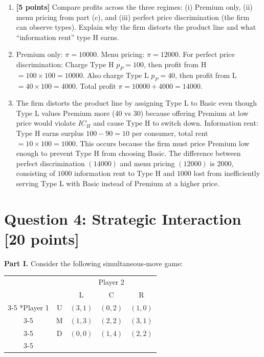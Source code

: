 \documentclass[11pt]{article}
\begin{document}
\begin{enumerate}[label=(\alph*)]
    \item \textbf{[5 points]} Compare profits across the three regimes: (i) Premium only, (ii) menu pricing from part (c), and (iii) perfect price discrimination (the firm can observe types). Explain why the firm distorts the product line and what ``information rent'' type H earns.
    \item[] Premium only: $\pi=10000$. Menu pricing: $\pi=12000$. For perfect price discrimination: Charge Type H $p_P=100$, then profit from H $=100\times100=10000$. Also charge Type L $p_P=40$, then profit from L $=40\times100=4000$. Total profit $\pi=10000+4000=14000$.
    \item[] The firm distorts the product line by assigning Type L to Basic even though Type L values Premium more (40 vs 30) because offering Premium at low price would violate $IC_H$ and cause Type H to switch down. Information rent: Type H earns surplus $100-90=10$ per consumer, total rent $=10\times100=1000$. This occurs because the firm must price Premium low enough to prevent Type H from choosing Basic. The difference between perfect discrimination $(14000)$ and menu pricing $(12000)$ is $2000$, consisting of $1000$ information rent to Type H and $1000$ lost from inefficiently serving Type L with Basic instead of Premium at a higher price.
\end{enumerate}

\section*{Question 4: Strategic Interaction [20 points]}

\textbf{Part I.} Consider the following simultaneous-move game:

\begin{center}
\begin{tabular}{cc|c|c|c|}
 & \multicolumn{1}{c}{} & \multicolumn{3}{c}{Player 2}\\
 & \multicolumn{1}{c}{} & \multicolumn{1}{c}{L} & \multicolumn{1}{c}{C} & \multicolumn{1}{c}{R} \\\cline{3-5}
\multirow{3}*{Player 1} & U & $(3, 1)$ & $(0, 2)$ & $(1, 0)$ \\\cline{3-5}
 & M & $(1, 3)$ & $(2, 2)$ & $(3, 1)$ \\\cline{3-5}
 & D & $(0, 0)$ & $(1, 4)$ & $(2, 2)$ \\\cline{3-5}
\end{tabular}
\end{center}
\end{document}
